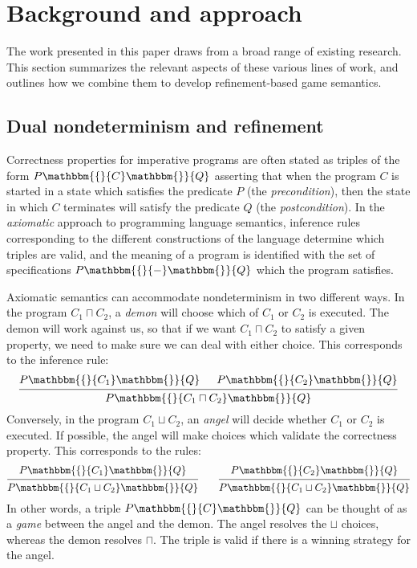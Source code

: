 \documentclass[sigplan,screen]{acmart}
\newcommand{\htr}[3]{{ {#1} \mathbbm{\{} {#2} \mathbbm{\}} {#3} }}
\begin{document}



\section{Background and approach} \label{sec:background} %


The work presented in this paper
draws from a broad range of existing research.
This section summarizes the relevant aspects
of these various lines of work,
and outlines how we combine them
to develop
refinement-based game semantics.


\subsection{Dual nondeterminism and refinement} \label{sec:refcal} %


Correctness properties for imperative programs
are often stated as triples of the form $\htr{P}{C}{Q}$
asserting that
when the program $C$ is started in a state which
satisfies the predicate $P$ (the \emph{precondition}),
then the state in which $C$ terminates
will satisfy the predicate $Q$ (the \emph{postcondition}).
In the \emph{axiomatic} approach to programming language semantics,
inference rules
corresponding to the different constructions of the language
determine which triples are valid,
and the meaning of a program is identified with
the set of specifications $\htr{P}{-}{Q}$
which the program satisfies.

Axiomatic semantics
can accommodate nondeterminism in two different ways.
In the program $C_1 \sqcap C_2$,
a \emph{demon} will choose which of $C_1$ or $C_2$ is executed.
The demon will work against us,
so that if we want $C_1 \sqcap C_2$ to satisfy a given property,
we need to make sure we can deal with either choice.
This corresponds to the inference rule:
\[
  \begin{prooftree}
    \hypo{\htr{P}{C_1}{Q}}
    \hypo{\htr{P}{C_2}{Q}}
    \infer2{\htr{P}{C_1 \sqcap C_2}{Q}}
  \end{prooftree}
\]
Conversely,
in the program $C_1 \sqcup C_2$,
an \emph{angel} will decide whether $C_1$ or $C_2$ is executed.
If possible,
the angel will make choices which validate
the correctness property.
This corresponds to the rules:
\[
  \begin{prooftree}
    \hypo{\htr{P}{C_1}{Q}}
    \infer1{\htr{P}{C_1 \sqcup C_2}{Q}}
  \end{prooftree}
  \qquad
  \begin{prooftree}
    \hypo{\htr{P}{C_2}{Q}}
    \infer1{\htr{P}{C_1 \sqcup C_2}{Q}}
  \end{prooftree}
\]
In other words,
a triple $\htr{P}{C}{Q}$
can be thought of as a \emph{game}
between the angel and the demon.
The angel resolves the $\sqcup$ choices,
whereas the demon resolves $\sqcap$.
The triple is valid if there is a winning strategy
for the angel.
\end{document}
